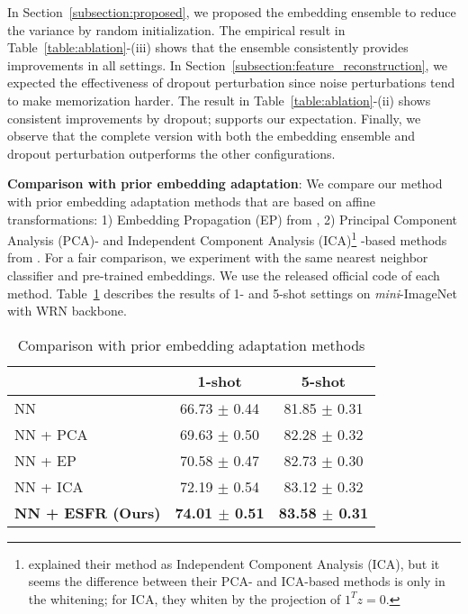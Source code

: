 \documentclass{article}
\begin{document}
In Section~\ref{subsection:proposed}, we proposed the embedding ensemble to reduce the variance by random initialization. The empirical result in Table~\ref{table:ablation}-(iii) shows that the ensemble consistently provides improvements in all settings. In Section~\ref{subsection:feature_reconstruction}, we expected the effectiveness of dropout perturbation since noise perturbations tend to make memorization harder. The result in Table~\ref{table:ablation}-(ii) shows consistent improvements by dropout; supports our expectation. Finally, we observe that the complete version with both the embedding ensemble and dropout perturbation outperforms the other configurations.

\textbf{Comparison with prior embedding adaptation}:
We compare our method with prior embedding adaptation methods that are based on affine transformations: 1) Embedding Propagation (EP) from \citet{epnet}, 2) Principal Component Analysis (PCA)- and Independent Component Analysis (ICA)\footnote{\citet{TAFSSL} explained their method as Independent Component Analysis (ICA), but it seems the difference between their PCA- and ICA-based methods is only in the whitening; for ICA, they whiten by the projection of $1^Tz=0$.} -based methods from \citet{TAFSSL}. For a fair comparison, we experiment with the same nearest neighbor classifier and pre-trained embeddings. We use the released official code of each method. Table~\ref{Table:PCA} describes the results of 1- and 5-shot settings on \textit{mini}-ImageNet with WRN backbone.
\begin{table}[ht]
	\vskip -0.15in
	\caption{Comparison with prior embedding adaptation methods}
	\label{Table:PCA}
	\begin{small}
		\begin{center}
			\begin{tabular}{lcc}
				\hline
				& \textbf{1-shot} & \textbf{5-shot} \\ \hline
				NN		       & 66.73 $\pm$ 0.44          & 81.85 $\pm$ 0.31          \\
				NN + PCA       & 69.63 $\pm$ 0.50          & 82.28 $\pm$ 0.32          \\
				NN + EP        & 70.58 $\pm$ 0.47          & 82.73 $\pm$ 0.30          \\
				NN + ICA       & 72.19 $\pm$ 0.54          & 83.12 $\pm$ 0.32          \\
				\rowcolor[HTML]{EFEFEF} 
				\textbf{NN + ESFR (Ours)} & \textbf{74.01 $\pm$ 0.51} & \textbf{83.58 $\pm$ 0.31}         \\ \hline
			\end{tabular}
		\end{center}
	\end{small}
	\vskip -0.15in
\end{table}
\end{document}
